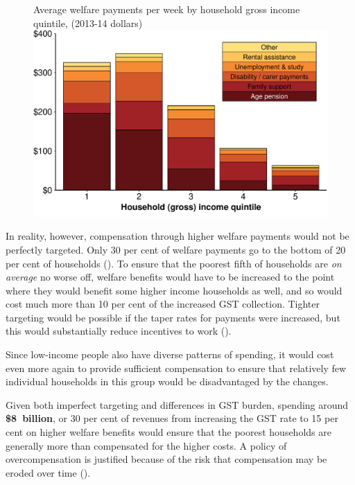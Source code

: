 \begin{figure}[tb]
%
{Average welfare payments per week by household gross income quintile, (2013-14 dollars)}
\includegraphics[width=\columnwidth]{atlas/figure/GST-Figure-6-1.pdf}

\end{figure}

In reality, however, compensation through higher welfare payments would not be perfectly targeted. Only 30 per cent of welfare payments go to the bottom of 20 per cent of households (). To ensure that the poorest fifth of households are \emph{on average} no worse off, welfare benefits would have to be increased to the point where they would benefit some higher income households as well, and so would cost much more than 10 per cent of the increased GST collection. Tighter targeting would be possible if the taper rates for payments were increased, but this would substantially reduce incentives to work (). 

Since low-income people also have diverse patterns of spending, it would cost even more again to provide sufficient compensation to ensure that relatively few individual households in this group would be disadvantaged by the changes. 

Given both imperfect targeting and differences in GST burden, spending around \textbf{\$8~billion}, or 30 per cent of revenues from increasing the GST rate to 15 per cent  on higher welfare benefits would ensure that the poorest households are generally more than compensated for the higher costs. A policy of overcompensation is justified because of the risk that compensation may be eroded over time ().

